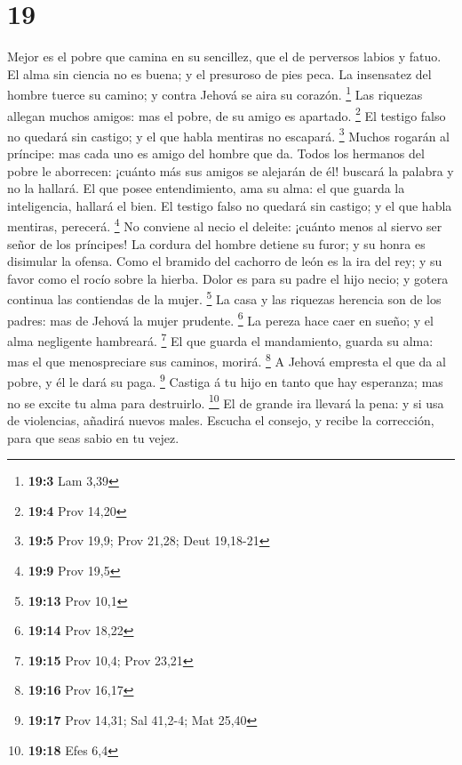 \hypertarget{section-18}{%
\section{19}\label{section-18}}

 Mejor es el pobre que camina en su sencillez, que el de
perversos labios y fatuo.  El alma sin ciencia no es
buena; y el presuroso de pies peca.  La insensatez del
hombre tuerce su camino; y contra Jehová se aira su corazón. \footnote{\textbf{19:3}
  Lam 3,39}  Las riquezas allegan muchos amigos: mas el
pobre, de su amigo es apartado. \footnote{\textbf{19:4} Prov 14,20}
 El testigo falso no quedará sin castigo; y el que habla
mentiras no escapará. \footnote{\textbf{19:5} Prov 19,9; Prov 21,28;
  Deut 19,18-21}  Muchos rogarán al príncipe: mas cada uno
es amigo del hombre que da.  Todos los hermanos del pobre
le aborrecen: ¡cuánto más sus amigos se alejarán de él! buscará la
palabra y no la hallará.  El que posee entendimiento, ama
su alma: el que guarda la inteligencia, hallará el bien. 
El testigo falso no quedará sin castigo; y el que habla mentiras,
perecerá. \footnote{\textbf{19:9} Prov 19,5}  No conviene
al necio el deleite: ¡cuánto menos al siervo ser señor de los príncipes!
 La cordura del hombre detiene su furor; y su honra es
disimular la ofensa.  Como el bramido del cachorro de
león es la ira del rey; y su favor como el rocío sobre la hierba.
 Dolor es para su padre el hijo necio; y gotera continua
las contiendas de la mujer. \footnote{\textbf{19:13} Prov 10,1}
 La casa y las riquezas herencia son de los padres: mas
de Jehová la mujer prudente. \footnote{\textbf{19:14} Prov 18,22}
 La pereza hace caer en sueño; y el alma negligente
hambreará. \footnote{\textbf{19:15} Prov 10,4; Prov 23,21}
 El que guarda el mandamiento, guarda su alma: mas el que
menospreciare sus caminos, morirá. \footnote{\textbf{19:16} Prov 16,17}
 A Jehová empresta el que da al pobre, y él le dará su
paga. \footnote{\textbf{19:17} Prov 14,31; Sal 41,2-4; Mat 25,40}
 Castiga á tu hijo en tanto que hay esperanza; mas no se
excite tu alma para destruirlo. \footnote{\textbf{19:18} Efes 6,4}
 El de grande ira llevará la pena: y si usa de
violencias, añadirá nuevos males.  Escucha el consejo, y
recibe la corrección, para que seas sabio en tu vejez. 

